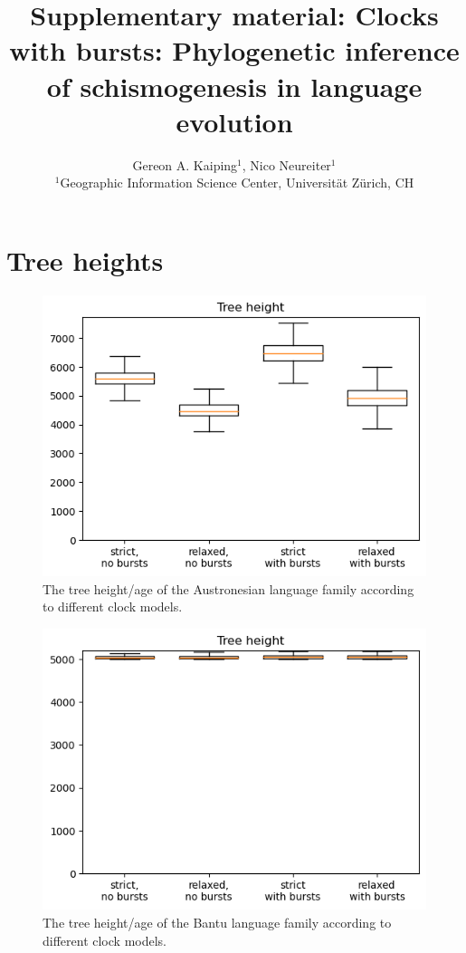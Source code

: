 \documentclass[a4paper]{article}
\title{Supplementary material: Clocks with bursts: Phylogenetic inference of schismogenesis in language evolution}
\date{}
\author{
  Gereon A. Kaiping$^{1}$,
  Nico Neureiter$^{1}$\\[2ex]
  $^{1}$Geographic Information Science Center, Universität Zürich, CH
}
\begin{document}
\maketitle
\renewcommand{\thepage}{S\arabic{page}} 
\renewcommand{\thesection}{S\arabic{section}}  
\renewcommand{\thetable}{S\arabic{table}}  
\renewcommand{\thefigure}{S\arabic{figure}}
\renewcommand{\figurename}{Figure} 

\section{Tree heights}

\begin{figure}
    \centering
    \includegraphics{supplement/analysis/austronesian_treeheight.png}
    \caption{The tree height/age of the Austronesian language family according to different clock models.}
    \label{fig:tree_height:austronesian}
\end{figure}

\begin{figure}
    \centering
    \includegraphics{supplement/analysis/bantu_treeheight.png}
    \caption{The tree height/age of the Bantu language family according to different clock models.}
    \label{fig:tree_height:bantu}
\end{figure}
\end{document}

